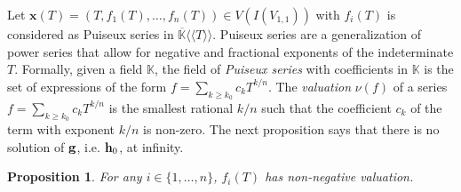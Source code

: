 \documentclass[11pt]{article}
\numberwithin{Property}{section}
\numberwithin{Theorem}{section}
\newtheorem{Proposition}{Proposition}%
\numberwithin{Proposition}{section}
\numberwithin{Lemma}{section}
\numberwithin{Corollary}{section}
\numberwithin{Definition}{section}
\numberwithin{Remark}{section}
\numberwithin{Conjecture}{section}
\numberwithin{Problem}{section}
\numberwithin{Claim}{section}
\theoremstyle{definition}
\numberwithin{Example}{section}
\renewcommand{\ge}{\geqslant}
\def\bar{\overline}
\renewcommand{\ge}{\geqslant} %
\newcommand{\field}{\mathbb{K}} %
\begin{document}
Let $\mathbf{x}(T) = (T, f_1(T), \ldots, f_n(T)) \in V(I(V_{1,1}))$ with $f_i(T)$ is considered as Puiseux series in $\bar{\field}\langle\langle T \rangle\rangle$. Puiseux series are a generalization of power series that allow for negative and fractional exponents of the indeterminate $T$. Formally, given a field $\field$, the field of \emph{Puiseux series} with coefficients in $\field$ is the set of expressions of the form $f = \sum_{k \ge k_0}c_kT^{k/n}$. The \emph{valuation} $\nu(f)$ of a series $f = \sum_{k \ge k_0}c_kT^{k/n}$ is the smallest rational $k/n$ such that the coefficient $c_k$ of the term with exponent $k/n$ is non-zero. The next proposition says that there is no solution of ${\bf g}$, i.e. ${\bf h}_0$, at infinity. 
\begin{Proposition}\label{valuation}
For any $i \in \{1, \ldots, n\}$, $f_i(T)$ has non-negative valuation. 
\end{Proposition}
\end{document}
